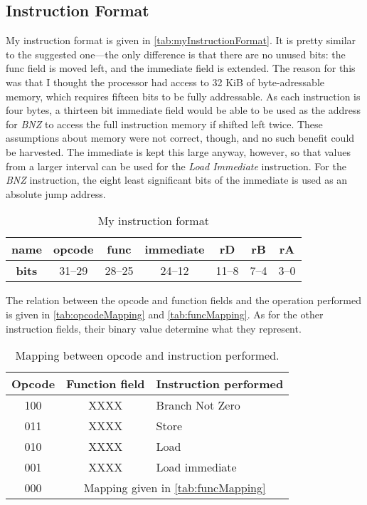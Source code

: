 \documentclass[11pt]{article}
\begin{document}
\subsection{Instruction Format}
\label{subsec:instructionFormat}
My instruction format is given in
\autoref{tab:myInstructionFormat}. It is pretty similar to the
suggested one---the only difference is that there are no unused bits:
the func field is moved left, and the immediate field is extended. The
reason for this was that I thought the processor had access to 32 KiB
of byte-adressable memory, which requires fifteen bits to be fully
addressable. As each instruction is four bytes, a thirteen bit
immediate field would be able to be used as the address for {\em BNZ}
to access the full instruction memory if shifted left twice. These
assumptions about memory were not correct, though, and no such benefit
could be harvested. The immediate is kept this large anyway, however,
so that values from a larger interval can be used for the {\em Load
  Immediate} instruction. For the {\em BNZ} instruction, the eight
least significant bits of the immediate is used as an absolute jump
address.

\begin{table}[htbp]
  \centering
  \begin{tabular}{|c|c|c|c|c|c|c|}
    \hline
    {\bf name} & opcode & func & immediate & rD & rB & rA \\ \hline
    {\bf bits} & 31--29 & 28--25 & 24--12 & 11--8 & 7--4 & 3--0 \\ \hline
  \end{tabular}
  \caption{My instruction format}
  \label{tab:myInstructionFormat}
\end{table}

The relation between the opcode and function fields and the operation
performed is given in \autoref{tab:opcodeMapping} and
\autoref{tab:funcMapping}. As for the other instruction fields, their
binary value determine what they represent.

\begin{table}[htbp]
  \centering
  \begin{tabular}{|c|c|p{50pt}|}
    \hline
    {\bf Opcode} & {\bf Function field} & {\bf Instruction performed} \\ \hline
    100 & XXXX & Branch Not Zero \\ \hline
    011 & XXXX & Store \\ \hline
    010 & XXXX & Load \\ \hline
    001 & XXXX & Load immediate \\ \hline
    000 & \multicolumn{2}{|p{70pt}|}{Mapping given in \autoref{tab:funcMapping}} \\ \hline
  \end{tabular}
  \caption{Mapping between opcode and instruction performed.}
  \label{tab:opcodeMapping}
\end{table}
\end{document}
